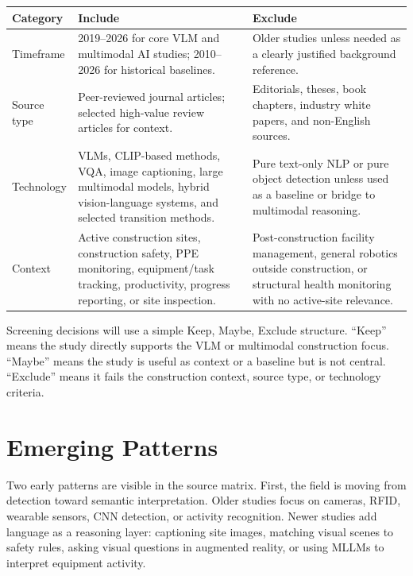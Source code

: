 \documentclass[10pt, letterpaper]{article}
\begin{document}
\begin{center}
\small
\renewcommand{\arraystretch}{1.2}
\begin{tabularx}{\textwidth}{p{2.4cm}YY}
\toprule
\textbf{Category} & \textbf{Include} & \textbf{Exclude} \\
\midrule
Timeframe & 2019--2026 for core VLM and multimodal AI studies; 2010--2026 for historical baselines. & Older studies unless needed as a clearly justified background reference. \\
Source type & Peer-reviewed journal articles; selected high-value review articles for context. & Editorials, theses, book chapters, industry white papers, and non-English sources. \\
Technology & VLMs, CLIP-based methods, VQA, image captioning, large multimodal models, hybrid vision-language systems, and selected transition methods. & Pure text-only NLP or pure object detection unless used as a baseline or bridge to multimodal reasoning. \\
Context & Active construction sites, construction safety, PPE monitoring, equipment/task tracking, productivity, progress reporting, or site inspection. & Post-construction facility management, general robotics outside construction, or structural health monitoring with no active-site relevance. \\
\bottomrule
\end{tabularx}
\end{center}

Screening decisions will use a simple Keep, Maybe, Exclude structure. ``Keep'' means the study directly supports the VLM or multimodal construction focus. ``Maybe'' means the study is useful as context or a baseline but is not central. ``Exclude'' means it fails the construction context, source type, or technology criteria.

\section{Emerging Patterns}

Two early patterns are visible in the source matrix. First, the field is moving from detection toward semantic interpretation. Older studies focus on cameras, RFID, wearable sensors, CNN detection, or activity recognition. Newer studies add language as a reasoning layer: captioning site images, matching visual scenes to safety rules, asking visual questions in augmented reality, or using MLLMs to interpret equipment activity.
\end{document}

